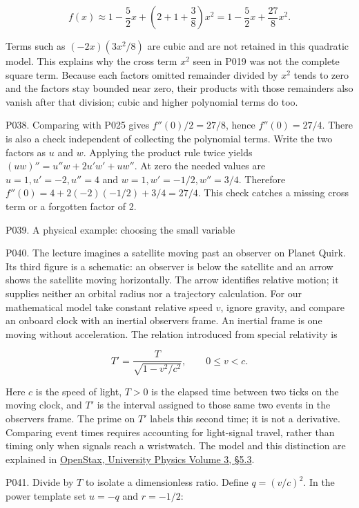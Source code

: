 \documentclass[
  11pt,
]{article}
\providecommand{\gt}{>}
\begin{document}
\[
f(x)\approx1-\frac52x+\left(2+1+\frac38\right)x^2
=1-\frac52x+\frac{27}{8}x^2.
\]

Terms such as \((-2x)(3x^2/8)\) are cubic and are not retained in this
quadratic model. This explains why the cross term \(x^2\) seen in P019
was not the complete square term. Because each factor\textquotesingle s
omitted remainder divided by \(x^2\) tends to zero and the factors stay
bounded near zero, their products with those remainders also vanish
after that division; cubic and higher polynomial terms do too.

P038. Comparing with P025 gives \(f''(0)/2=27/8\), hence
\(f''(0)=27/4\). There is also a check independent of collecting the
polynomial terms. Write the two factors as \(u\) and \(w\). Applying the
product rule twice yields \((uw)''=u''w+2u'w'+uw''\). At zero the needed
values are \(u=1,u'=-2,u''=4\) and \(w=1,w'=-1/2,w''=3/4\). Therefore
\(f''(0)=4+2(-2)(-1/2)+3/4=27/4\). This check catches a missing cross
term or a forgotten factor of 2.

P039. A physical example: choosing the small variable

P040. The lecture imagines a satellite moving past an observer on Planet
Quirk. Its third figure is a schematic: an observer is below the
satellite and an arrow shows the satellite moving horizontally. The
arrow identifies relative motion; it supplies neither an orbital radius
nor a trajectory calculation. For our mathematical model take constant
relative speed \(v\), ignore gravity, and compare an onboard clock with
an inertial observer\textquotesingle s frame. An inertial frame is one
moving without acceleration. The relation introduced from special
relativity is

\[
T'=\frac{T}{\sqrt{1-v^2/c^2}},\qquad 0\le v<c.
\]

Here \(c\) is the speed of light, \(T\gt 0\) is the elapsed time between
two ticks on the moving clock, and \(T'\) is the interval assigned to
those same two events in the observer\textquotesingle s frame. The prime
on \(T'\) labels this second time; it is not a derivative. Comparing
event times requires accounting for light-signal travel, rather than
timing only when signals reach a wristwatch. The model and this
distinction are explained in
\href{https://openstax.org/books/university-physics-volume-3/pages/5-3-time-dilation}{OpenStax,
University Physics Volume 3, §5.3}.

P041. Divide by \(T\) to isolate a dimensionless ratio. Define
\(q=(v/c)^2\). In the power template set \(u=-q\) and \(r=-1/2\):
\end{document}
